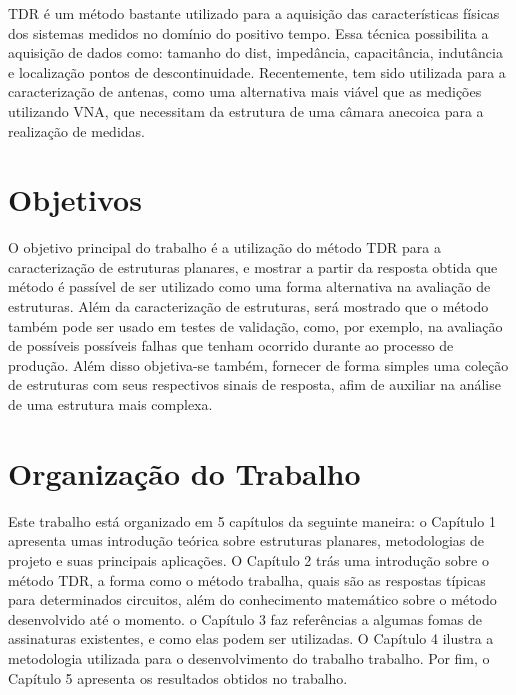 TDR é um método bastante utilizado para a aquisição das características físicas dos sistemas medidos no domínio do positivo tempo. Essa técnica possibilita a aquisição de dados como: tamanho do dist, impedância, capacitância, indutância e localização pontos de descontinuidade. Recentemente, tem sido utilizada para a caracterização de antenas, como uma alternativa mais viável que as medições utilizando VNA, que necessitam da estrutura de uma câmara anecoica para a realização de medidas.

\section*{Objetivos}

O objetivo principal do trabalho é a utilização do método TDR para a caracterização de estruturas planares, e mostrar a partir da resposta obtida que método é passível de ser utilizado como uma forma alternativa na avaliação de estruturas.  Além da caracterização de estruturas, será mostrado que o método também pode ser usado em testes de validação, como, por exemplo, na avaliação de possíveis possíveis falhas que tenham ocorrido durante ao processo de produção. Além disso objetiva-se também, fornecer de forma simples uma coleção de estruturas com seus respectivos sinais de resposta, afim de auxiliar na análise de uma estrutura mais complexa.

\section*{Organização do Trabalho}

Este trabalho está organizado em 5 capítulos da seguinte maneira: o Capítulo 1 apresenta  umas introdução teórica sobre estruturas planares, metodologias de projeto e suas principais aplicações. O Capítulo 2 trás uma introdução sobre o método TDR, a forma como o método trabalha, quais são as respostas típicas para determinados circuitos, além do conhecimento matemático sobre o método desenvolvido até o momento. o Capítulo 3 faz referências a algumas fomas de assinaturas existentes, e como elas podem ser utilizadas. O Capítulo 4 ilustra a metodologia utilizada para o desenvolvimento do trabalho trabalho. Por fim, o Capítulo 5 apresenta os resultados obtidos no trabalho.
